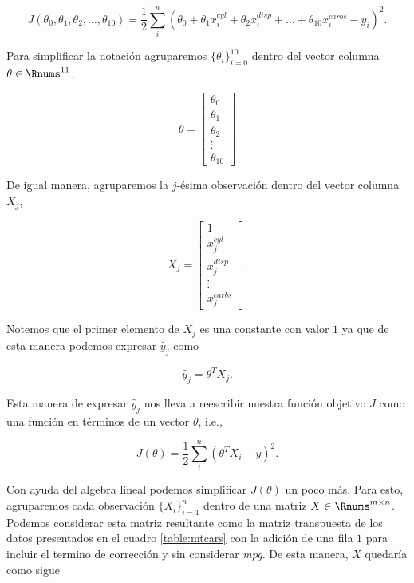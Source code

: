 \documentclass[11pt]{article}
\begin{document}
\begin{equation}
J(\theta_0, \theta_1, \theta_2, \ldots, \theta_{10}) = \frac{1}{2}\sum_i^n(\theta_0 + \theta_1x^{cyl}_i + \theta_2x^{disp}_i + \ldots + \theta_{10}x^{carbs}_i - y_i)^2.
\end{equation}
 
 
 Para simplificar la notación agruparemos $\{\theta_i\}_{i=0}^{10}$ dentro del vector columna $\theta \in \Rnums^{11}$,
 
\begin{equation}
	\theta = \begin{bmatrix}
	    \theta_0 \\
	    \theta_1 \\
	    \theta_2 \\
	    \vdots \\
	    \theta_{10}
	 \end{bmatrix}
\end{equation}

De igual manera, agruparemos la $j$-ésima observación dentro del vector columna $X_j$,

\begin{equation}
X_{j} = \begin{bmatrix}
            1 \\
            x^{cyl}_j \\
            x^{disp}_j \\
            \vdots \\
            x^{carbs}_j 
         \end{bmatrix}.
\end{equation}

Notemos que el primer elemento de $X_j$ es una constante con valor $1$ ya que de esta manera podemos expresar $\hat y_j$ como

\begin{equation}
	\hat y_j = \theta^TX_j.
\end{equation}

Esta manera de expresar $\hat y_j$ nos lleva a reescribir nuestra función objetivo $J$ como una función en términos de un vector $\theta$, i.e.,

\begin{equation}
  J(\theta) = \frac{1}{2}\sum_i^n(\theta^TX_i - y)^2.
\end{equation}

Con ayuda del algebra lineal podemos simplificar $J(\theta)$ un poco más. Para esto, agruparemos cada observación $\{X_i\}_{i=1}^n$ dentro de una matriz $X\in\Rnums^{m\times n}$. Podemos considerar esta matriz resultante como la matriz transpuesta de los datos presentados en el cuadro \ref{table:mtcars} con la adición de una fila $1$ para incluir el termino de corrección y sin considerar \textit{mpg}. De esta manera, $X$ quedaría como sigue
\end{document}

